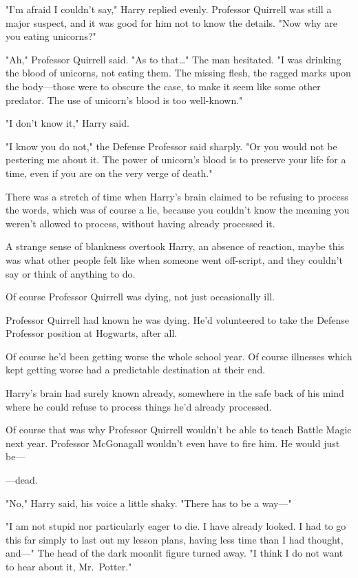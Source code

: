 "I'm afraid I couldn't say," Harry replied evenly. Professor Quirrell was still a major suspect, and it was good for him not to know the details. "Now why are you eating unicorns?"

"Ah," Professor Quirrell said. "As to that…" The man hesitated. "I was drinking the blood of unicorns, not eating them. The missing flesh, the ragged marks upon the body---those were to obscure the case, to make it seem like some other predator. The use of unicorn's blood is too well-known."

"I don't know it," Harry said.

"I know you do not," the Defense Professor said sharply. "Or you would not be pestering me about it. The power of unicorn's blood is to preserve your life for a time, even if you are on the very verge of death."

There was a stretch of time when Harry's brain claimed to be refusing to process the words, which was of course a lie, because you couldn't know the meaning you weren't allowed to process, without having already processed it.

A strange sense of blankness overtook Harry, an absence of reaction, maybe this was what other people felt like when someone went off-script, and they couldn't say or think of anything to do.

Of course Professor Quirrell was dying, not just occasionally ill.

Professor Quirrell had known he was dying. He'd volunteered to take the Defense Professor position at Hogwarts, after all.

Of course he'd been getting worse the whole school year. Of course illnesses which kept getting worse had a predictable destination at their end.

Harry's brain had surely known already, somewhere in the safe back of his mind where he could refuse to process things he'd already processed.

Of course that was why Professor Quirrell wouldn't be able to teach Battle Magic next year. Professor McGonagall wouldn't even have to fire him. He would just be---

---dead.

"No," Harry said, his voice a little shaky. "There has to be a way---"

"I am not stupid nor particularly eager to die. I have already looked. I had to go this far simply to last out my lesson plans, having less time than I had thought, and---" The head of the dark moonlit figure turned away. "I think I do not want to hear about it, Mr.~Potter."

